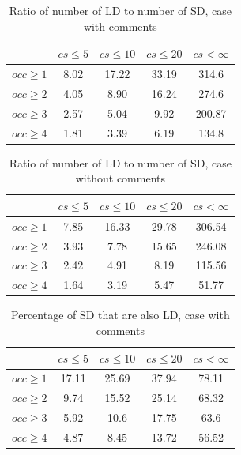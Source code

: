 \documentclass[a4paper,twoside]{article}
\begin{document}
\begin{table}[!h]
\renewcommand{\arraystretch}{1.2}
\caption{Ratio of number of LD to number of SD, case with comments}
\label{tab:ratio:comm}
\centering

\begin{tabular}{|c|c|c|c|c|}
\hline
	      &	$cs\leq 5$	&	$cs\leq 10$	&	$cs\leq 20$	&	$cs<\infty$	\\
\hline
$occ\geq 1$	&	8.02	&	17.22	&	33.19	&	314.6	\\
$occ\geq 2$	&	4.05	&	8.90	&	16.24	&	274.6	\\
$occ\geq 3$	&	2.57	&	5.04	&	9.92	&	200.87	\\
$occ\geq 4$	&	1.81	&	3.39	&	6.19	&	134.8	\\
\hline
\end{tabular}
\end{table}


\begin{table}[!h]
\renewcommand{\arraystretch}{1.2}
\caption{Ratio of number of LD to number of SD, case without comments}
\label{tab:ratio:nocomm}
\centering

\begin{tabular}{|c|c|c|c|c|}
\hline
	      &	$cs\leq 5$	&	$cs\leq 10$	&	$cs\leq 20$	&	$cs< \infty$	\\
\hline
$occ\geq 1$	&	7.85	&	16.33	&	29.78	&	306.54	\\
$occ\geq 2$	&	3.93	&	7.78	&	15.65	&	246.08	\\
$occ\geq 3$	&	2.42	&	4.91	&	8.19	&	115.56	\\
$occ\geq 4$	&	1.64	&	3.19	&	5.47	&	51.77	\\

\hline
\end{tabular}
\end{table}


\begin{table}[!h]
\renewcommand{\arraystretch}{1.2}
\caption{Percentage of SD that are also LD, case with comments}
\label{tab:percSD:comm}
\centering

\begin{tabular}{|c|c|c|c|c|}
\hline
	      &	$cs\leq 5$	&	$cs\leq 10$	&	$cs\leq 20$	&	$cs< \infty$	\\
\hline
$occ\geq 1$	&	17.11	&	25.69	&	37.94	&	78.11	\\
$occ\geq 2$	&	9.74	&	15.52	&	25.14	&	68.32	\\
$occ\geq 3$	&	5.92	&	10.6	&	17.75	&	63.6	\\
$occ\geq 4$	&	4.87	&	8.45	&	13.72	&	56.52	\\
\hline
\end{tabular}
\end{table}
\end{document}
